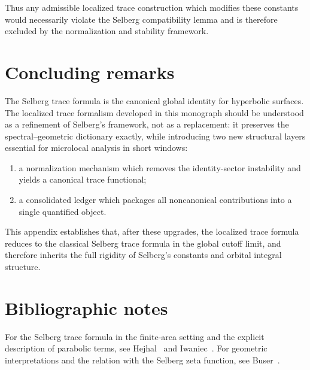 Thus any admissible localized trace construction which modifies these constants would necessarily violate the Selberg
compatibility lemma and is therefore excluded by the normalization and stability framework.

\section{Concluding remarks}
\label{sec:H.conclusion}

The Selberg trace formula is the canonical global identity for hyperbolic surfaces.
The localized trace formalism developed in this monograph should be understood as a refinement of Selberg's framework,
not as a replacement: it preserves the spectral--geometric dictionary exactly, while introducing two new structural
layers essential for microlocal analysis in short windows:
\begin{enumerate}
\item a normalization mechanism which removes the identity-sector instability and yields a canonical trace functional;
\item a consolidated ledger which packages all noncanonical contributions into a single quantified object.
\end{enumerate}

This appendix establishes that, after these upgrades, the localized trace formula reduces to the classical Selberg
trace formula in the global cutoff limit, and therefore inherits the full rigidity of Selberg's constants and orbital
integral structure.

\section*{Bibliographic notes}

For the Selberg trace formula in the finite-area setting and the explicit description of parabolic terms, see
Hejhal~\cite{Hejhal1983} and Iwaniec~\cite{Iwaniec2002}.
For geometric interpretations and the relation with the Selberg zeta function, see Buser~\cite{Buser1992}.

